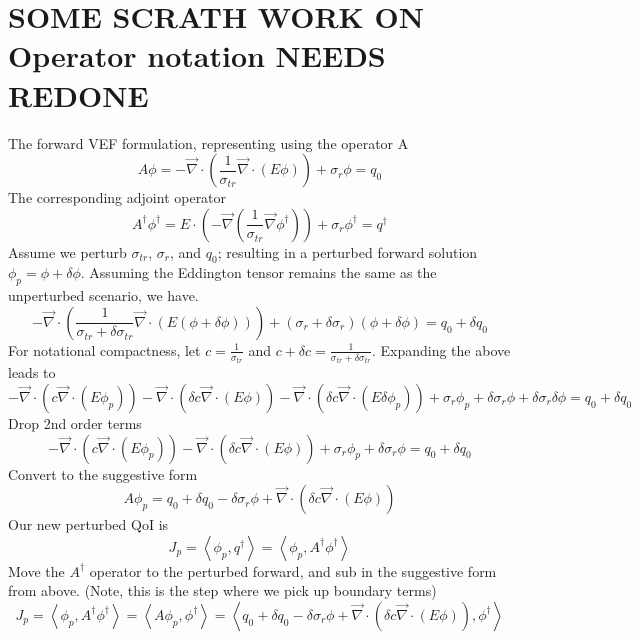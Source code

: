 \documentclass{article}
\newcommand{\bra}{\left\langle}
\newcommand{\ket}{\right\rangle}
\newcommand{\vdiv}{\vec{\nabla} \cdot}
\newcommand{\vgrad}{\vec{\nabla}}
\begin{document}
\section{SOME SCRATH WORK ON Operator notation NEEDS REDONE}
The forward VEF formulation, representing using the operator A
\[
A \phi = -\vdiv \left( \frac{1}{\sigma_{tr}} \vdiv \left( E \phi \right) \right)
+ \sigma_r \phi
= q_0 
\]
The corresponding adjoint operator
\[
A^\dag \phi^\dag = E \cdot \left( - \vgrad \left( \frac{1}{\sigma_{tr}} \vgrad \phi^\dag \right) \right)
+ \sigma_r \phi^\dag
= q^\dag
\]
Assume we perturb $\sigma_{tr}$, $\sigma_r$, and $q_0$; resulting in a perturbed forward solution $\phi_p = \phi + \delta \phi$. Assuming the Eddington tensor remains the same as the unperturbed scenario, we have.
\[
-\vdiv \left( \frac{1}{\sigma_{tr}+\delta \sigma_{tr}} \vdiv \left( E \left( \phi + \delta \phi \right) \right) \right)
+ \left( \sigma_r + \delta \sigma_r \right) \left( \phi + \delta \phi \right)
= q_0 + \delta q_0
\]
For notational compactness, let $c=\frac{1}{\sigma_{tr}}$ and $c + \delta c = \frac{1}{\sigma_{tr}+\delta \sigma_{tr}}$. Expanding the above leads to 
\[ 
-\vdiv \left( c \vdiv \left( E \phi_p \right) \right) 
- \vdiv \left( \delta c \vdiv \left( E \phi \right) \right) 
- \vdiv \left( \delta c \vdiv \left( E \delta \phi_p \right) \right) 
+ \sigma_r \phi_p
+ \delta \sigma_r \phi
+ \delta \sigma_r \delta \phi
= q_0 + \delta q_0 
\]
Drop 2nd order terms
\[ 
-\vdiv \left( c \vdiv \left( E \phi_p \right) \right) 
- \vdiv \left( \delta c \vdiv \left( E \phi \right) \right) 
+ \sigma_r \phi_p
+ \delta \sigma_r \phi
= q_0 + \delta q_0 
\]
Convert to the suggestive form
\[ 
A \phi_p
= q_0 + \delta q_0 - \delta \sigma_r \phi + \vdiv \left( \delta c \vdiv \left( E \phi \right) \right) 
\]
Our new perturbed QoI is
\[
J_p = \bra \phi_p , q^\dag \ket = \bra \phi_p , A^\dag \phi^\dag\ket
\]
Move the $A^\dag$ operator to the perturbed forward, and sub in the suggestive form from above. (Note, this is the step where we pick up boundary terms)
\[
J_p = \bra \phi_p , A^\dag \phi^\dag\ket =  \bra A \phi_p , \phi^\dag\ket = \bra q_0 + \delta q_0 - \delta \sigma_r \phi + \vdiv \left( \delta c \vdiv \left( E \phi \right) \right), \phi^\dag \ket
\]
\end{document}
